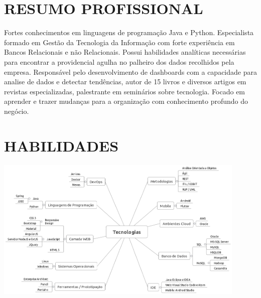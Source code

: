 \documentclass{res}
\begin{document}
\thispagestyle{empty} %
\address{{\bf Brasília} -- Asa Norte \\
  Tel. (61) 99874.0763 \\  Tel.Recado (61) 3201.5834}
                                      
\begin{resume}
 
\section{RESUMO PROFISSIONAL}
\vspace{8pt}
Fortes conhecimentos em linguagens de programação Java e Python. Especialista formado em Gestão da Tecnologia da Informação com forte experiência em Bancos Relacionais e não Relacionais. Possui habilidades analíticas necessárias para encontrar a providencial agulha no palheiro dos dados recolhidos pela empresa. Responsável pelo desenvolvimento de dashboards com a capacidade para analise de dados e detectar tendências, autor de 15 livros e diversos artigos em revistas especializadas, palestrante em seminários sobre tecnologia. Focado em aprender e trazer mudanças para a organização com conhecimento profundo do negócio.
 
\section{HABILIDADES}
\vspace{8pt}
\includegraphics[width=0.9\textwidth]{tecnologias.png}


\end{resume}
\end{document}
